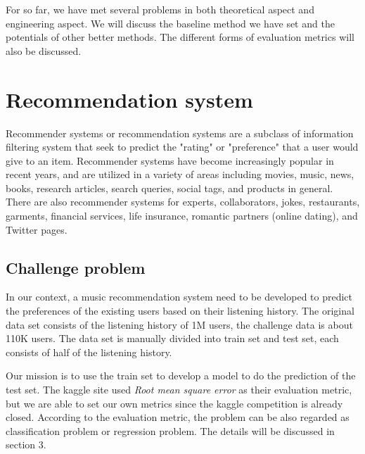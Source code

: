 \documentclass{article}
\begin{document}
For so far, we have met several problems in both theoretical aspect and engineering aspect. We will discuss the baseline method we have set and the potentials of other better methods. The different forms of evaluation metrics will also be discussed.
\section{Recommendation system}
Recommender systems or recommendation systems are a subclass of information filtering system that seek to predict the "rating" or "preference" that a user would give to an item. Recommender systems have become increasingly popular in recent years, and are utilized in a variety of areas including movies, music, news, books, research articles, search queries, social tags, and products in general. There are also recommender systems for experts, collaborators, jokes, restaurants, garments, financial services, life insurance, romantic partners (online dating), and Twitter pages.

\subsection{Challenge problem}
In our context, a music recommendation system need to be developed to predict the preferences of the existing users based on their listening history. The original data set consists of the listening history of 1M users, the challenge data is about 110K users. The data set is manually divided into train set and test set, each consists of half of the listening history.

Our mission is to use the train set to develop a model to do the prediction of the test set. The kaggle site used \emph{Root mean square error} as their evaluation metric, but we are able to set our own metrics since the kaggle competition is already closed. According to the evaluation metric, the problem can be also regarded as classification problem or regression problem. The details will be discussed in section 3.
\end{document}
